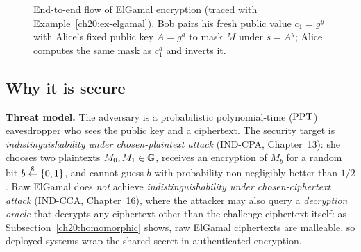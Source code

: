 \begin{figure}[htbp]
\caption{End-to-end flow of ElGamal encryption (traced with Example~\ref{ch20:ex-elgamal}). Bob pairs his fresh public value $c_1 = g^y$ with Alice's fixed public key $A = g^a$ to mask $M$ under $s = A^y$; Alice computes the same mask as $c_1^a$ and inverts it.}
\label{ch20:fig-elgamal}
\end{figure}

\subsection{Why it is secure}

\begin{focusbox}
\textbf{Threat model.} The adversary is a probabilistic polynomial-time ($\mathrm{PPT}$) eavesdropper who sees the
public key and a ciphertext. The security target is \emph{indistinguishability under
chosen-plaintext attack} (IND-CPA, Chapter~13): she chooses two plaintexts $M_0, M_1 \in \mathbb{G}$, receives an encryption of $M_b$ for a random bit $b \stackrel{\$}{\gets} \{0,1\}$, and cannot guess $b$ with probability non-negligibly better than $1/2$. Raw ElGamal does \emph{not} achieve \emph{indistinguishability under chosen-ciphertext attack} (IND-CCA, Chapter~16), where the attacker may also query a \emph{decryption oracle} that decrypts any ciphertext other than the challenge ciphertext itself: as Subsection~\ref{ch20:homomorphic} shows, raw ElGamal ciphertexts are malleable, so deployed systems wrap the shared secret in authenticated encryption.
\end{focusbox}

